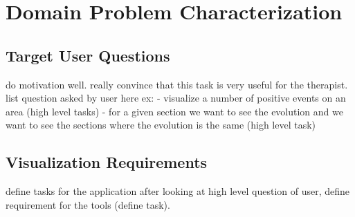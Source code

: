 \chapter{Domain Problem Characterization}
\label{chap:back}

\section{Target User Questions}
do motivation well. really convince that this task is very useful for the therapist.
list question asked by user here
ex: - visualize a number of positive events on an area (high level tasks)
		- for a given section we want to see the evolution and we want to see the sections where the evolution is the same (high level task)
\section{Visualization Requirements}
define tasks for the application
after looking at high level question of user, define requirement for the tools (define task).